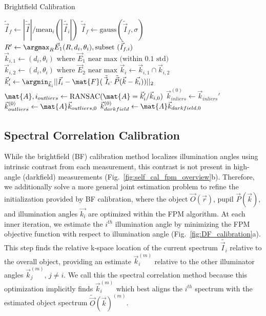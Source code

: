 \begin{algorithm}
\caption{Brightfield Calibration}\label{alg:BF}
\begin{algorithmic}[1]
\State $\tilde{\vec{I}}_f \gets |\tilde{\vec{I}}|/\textrm{mean}_i(|\tilde{\vec{I}_i}|)$\label{alg:1}
\State $\tilde{\vec{I}}_f \gets \textrm{gauss}(\tilde{\vec{I}}_f,\sigma)$\label{alg:2}
\State $R' \gets \argmax_R \vec{E}_1(R,d_i,\theta_i), \textrm{subset }(\tilde{\vec{I}}_{f,i})$\label{alg:3}
\State $\vec{k}_{i,1} \gets (d_i,\theta_i) \textrm{ where } \vec{E}_1 \textrm{ near max (within 0.1 std)}$\label{alg:5}
\State $\vec{k}_{i,2} \gets (d_i,\theta_i) \textrm{ where } \vec{E}_2 \textrm{ near max}$
\State $\vec{k}_{i} \gets \vec{k}_{i,1} \cap \vec{k}_{i,2}$
\State $\vec{k}_i' \gets \argmin_{\vec{k}_i} ||\vec{I}_i - \mat{F}(\tilde{\vec{I}_i}\cdot\tilde{\vec{P}}(\vec{k}-\vec{k_i}))||_2$ 
\EndFor \label{alg:8}
\State $\mat{A}, i_{outliers} \gets \textrm{RANSAC}(\mat{A}=\vec{k}_i'/\vec{k}_{i,0})$ \label{alg:9}
\State $\vec{k}_{inliers}^{(0)} \gets \vec{k}_{inliers}'$
\State $\vec{k}_{outliers}^{(0)} \gets \mat{A}\vec{k}_{outliers,0}$
\State $\vec{k}_{darkfield}^{(0)} \gets \mat{A}\vec{k}_{darkfield,0}$ \label{alg:12}

\end{algorithmic}
\end{algorithm}

\subsection{Spectral Correlation Calibration}
While the brightfield (BF) calibration method localizes illumination angles using intrinsic contrast from each measurement, this contrast is not present in high-angle (darkfield) measurements (Fig.~\ref{fig:self_cal_fpm_overview}b). Therefore, we additionally solve a more general joint estimation problem to refine the initialization provided by BF calibration, where the object $\vec{O}(\vec{r})$, pupil $\vec{P}(\vec{k})$, and illumination angles $\vec{k_i}$ are optimized within the FPM algorithm. At each inner iteration, we estimate the $i^{th}$ illumination angle by minimizing the FPM objective function with respect to illumination angle (Fig.~\ref{fig:DF_calibration}a). This step finds the relative k-space location of the current spectrum $\tilde{\vec{I}_i}$ relative to the overall object, providing an estimate $\vec{k}_i^{(m)}$ relative to the other illuminator angles $\vec{k}^{(m)}_j$, $j\neq i$. We call this the spectral correlation method because this optimization implicitly finds $\vec{k}_i^{(m)}$ which best aligns the $i^{th}$ spectrum with the estimated object spectrum $\tilde{\vec{O}}(\vec{k})^{(m)}$. 


